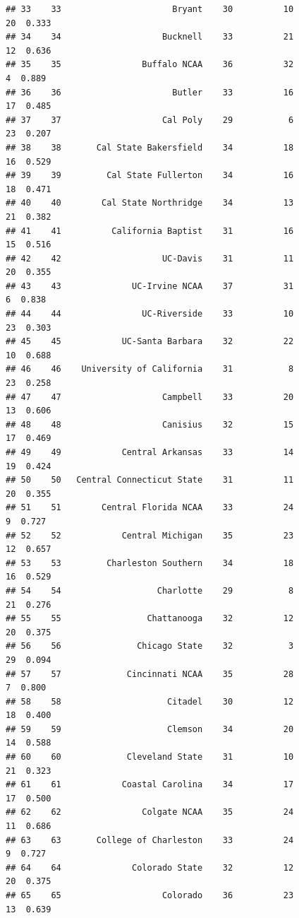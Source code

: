 \documentclass[]{book}
\begin{document}
\begin{verbatim}
## 33    33                      Bryant    30          10            20  0.333
## 34    34                    Bucknell    33          21            12  0.636
## 35    35                Buffalo NCAA    36          32             4  0.889
## 36    36                      Butler    33          16            17  0.485
## 37    37                    Cal Poly    29           6            23  0.207
## 38    38       Cal State Bakersfield    34          18            16  0.529
## 39    39         Cal State Fullerton    34          16            18  0.471
## 40    40        Cal State Northridge    34          13            21  0.382
## 41    41          California Baptist    31          16            15  0.516
## 42    42                    UC-Davis    31          11            20  0.355
## 43    43              UC-Irvine NCAA    37          31             6  0.838
## 44    44                UC-Riverside    33          10            23  0.303
## 45    45            UC-Santa Barbara    32          22            10  0.688
## 46    46    University of California    31           8            23  0.258
## 47    47                    Campbell    33          20            13  0.606
## 48    48                    Canisius    32          15            17  0.469
## 49    49            Central Arkansas    33          14            19  0.424
## 50    50   Central Connecticut State    31          11            20  0.355
## 51    51        Central Florida NCAA    33          24             9  0.727
## 52    52            Central Michigan    35          23            12  0.657
## 53    53         Charleston Southern    34          18            16  0.529
## 54    54                   Charlotte    29           8            21  0.276
## 55    55                 Chattanooga    32          12            20  0.375
## 56    56               Chicago State    32           3            29  0.094
## 57    57             Cincinnati NCAA    35          28             7  0.800
## 58    58                     Citadel    30          12            18  0.400
## 59    59                     Clemson    34          20            14  0.588
## 60    60             Cleveland State    31          10            21  0.323
## 61    61            Coastal Carolina    34          17            17  0.500
## 62    62                Colgate NCAA    35          24            11  0.686
## 63    63       College of Charleston    33          24             9  0.727
## 64    64              Colorado State    32          12            20  0.375
## 65    65                    Colorado    36          23            13  0.639

\end{verbatim}
\end{document}
